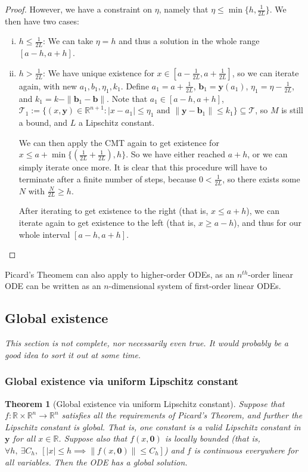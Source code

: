 \documentclass[10pt,fleqn]{article}
\newcommand{\reals}{\mathbb{R}}
\newcommand{\vc}[1]{\boldsymbol{#1}}
\theoremstyle{definition} \newtheorem{defn}{Definition}[section]
\theoremstyle{plain}      \newtheorem{thm}[defn]{Theorem}
\theoremstyle{plain}      \newtheorem{lem}[defn]{Lemma}
\theoremstyle{definition} \newtheorem{prop}[defn]{Proposition}
\theoremstyle{definition} \newtheorem{cor}[defn]{Corollary}
\theoremstyle{definition} \newtheorem{ex}[defn]{Example}
\theoremstyle{definition} \newtheorem{rem}[defn]{Remark}
\begin{document}
\begin{proof}
    However, we have a constraint on $\eta$, namely that $\eta\leq\min\{h,\frac{1}{2L}\}$.
    We then have two cases:
    \begin{enumerate}[(i)]
        \item $h\leq\frac{1}{2L}$:
        We can take $\eta=h$ and thus a solution in the whole range $[a-h,a+h]$.
        \item $h>\frac{1}{2L}$:
        We have unique existence for $x\in[a-\frac{1}{2L},a+\frac{1}{2L}]$, so we can iterate again, with new $a_1,b_1,\eta_1,k_1$.
        Define $a_1=a+\frac{1}{2L}$, $\vc{b}_1=\vc{y}(a_1)$, $\eta_1=\eta-\frac{1}{2L}$, and $k_1=k-\|\vc{b}_1-\vc{b}\|$.
        Note that $a_1\in[a-h,a+h]$, $\mathcal{T}_1:=\{(x,\vc{y})\in\reals^{n+1}\colon|x-a_1|\leq \eta_1\text{ and }\|\vc{y}-\vc{b}_1\|\leq k_1\}\subseteq\mathcal{T}$, so $M$ is still a bound, and $L$ a Lipschitz constant.

        We can then apply the CMT again to get existence for $x\leq a+\min\{\left(\frac{1}{2L}+\frac{1}{2L}\right),h\}$.
        So we have either reached $a+h$, or we can simply iterate once more.
        It is clear that this procedure will have to terminate after a finite number of steps, because $0<\frac{1}{2L}$, so there exists some $N$ with $\frac{N}{2L}\geq h$.

        After iterating to get existence to the right (that is, $x\leq a+h$), we can iterate again to get existence to the left (that is, $x\geq a-h$), and thus for our whole interval $[a-h,a+h]$.
    \end{enumerate}
\end{proof}

Picard's Theomem can also apply to higher-order ODEs, as an $n^{th}$-order linear ODE can be written as an $n$-dimensional system of first-order linear ODEs.


\subsection{Global existence}


\emph{This section is not complete, nor necessarily even true.
It would probably be a good idea to sort it out at some time.}


\subsubsection{Global existence via uniform Lipschitz constant}

\begin{thm}[Global existence via uniform Lipschitz constant]
    Suppose that $f:\reals\times\reals^n\to\reals^n$ satisfies all the requirements of Picard's Theorem, and further the Lipschitz constant is global.
    That is, one constant is a valid Lipschitz constant in $\vc{y}$ for all $x\in\reals$.
    Suppose also that $f(x,\vc{0})$ is locally bounded (that is, $\forall h,~\exists C_h,~[|x|\leq h\implies\|f(x,\vc{0})\|\leq C_h]$) and $f$ is continuous everywhere for all variables.
    Then the ODE has a global solution.
\end{thm}
\end{document}
